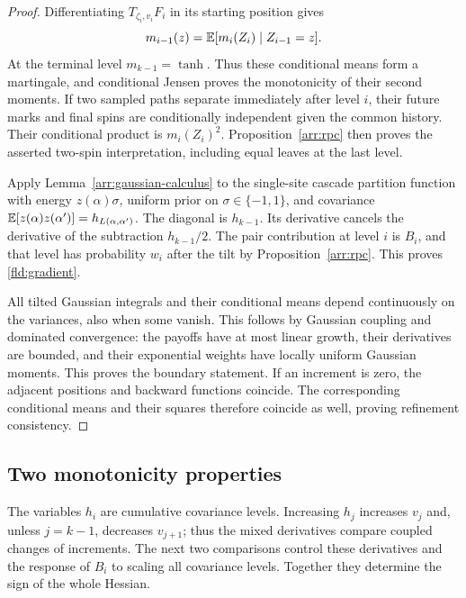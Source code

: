 \begin{proof}
Differentiating $T_{\zeta_i,v_i}F_i$ in its starting position gives
\[
 m_{i-1}(z)=\mathbb E[m_i(Z_i)\mid Z_{i-1}=z].
\]
At the terminal level $m_{k-1}=\tanh$. Thus these conditional means
form a martingale, and conditional Jensen proves the monotonicity of
their second moments. If two sampled paths separate immediately after
level $i$, their future marks and final spins are conditionally
independent given the common history. Their conditional product is
$m_i(Z_i)^2$. Proposition~\ref{arr:rpc} then proves the asserted
two-spin interpretation, including equal leaves at the last level.

Apply Lemma~\ref{arr:gaussian-calculus} to the single-site cascade
partition function with energy $z(\alpha)\sigma$, uniform prior on
$\sigma\in\{-1,1\}$, and covariance
$\mathbb E[z(\alpha)z(\alpha')]=h_{L(\alpha,\alpha')}$. The diagonal is
$h_{k-1}$. Its derivative cancels the derivative of the subtraction
$h_{k-1}/2$. The pair contribution at level $i$ is $B_i$, and that
level has probability $w_i$ after the tilt by
Proposition~\ref{arr:rpc}. This proves \eqref{fld:gradient}.

All tilted Gaussian integrals and their conditional means depend
continuously on the variances, also when some vanish. This follows by
Gaussian coupling and dominated convergence: the payoffs have at most
linear growth, their derivatives are bounded, and their exponential
weights have locally uniform Gaussian moments. This proves the
boundary statement. If an increment is zero, the adjacent positions
and backward functions coincide. The corresponding conditional means
and their squares therefore coincide as well, proving refinement
consistency.
\end{proof}

\subsection{Two monotonicity properties}

The variables $h_i$ are cumulative covariance levels. Increasing $h_j$
increases $v_j$ and, unless $j=k-1$, decreases $v_{j+1}$; thus the
mixed derivatives compare coupled changes of increments. The next two
comparisons control these derivatives and the response of $B_i$ to
scaling all covariance levels. Together they determine the sign of the
whole Hessian.

